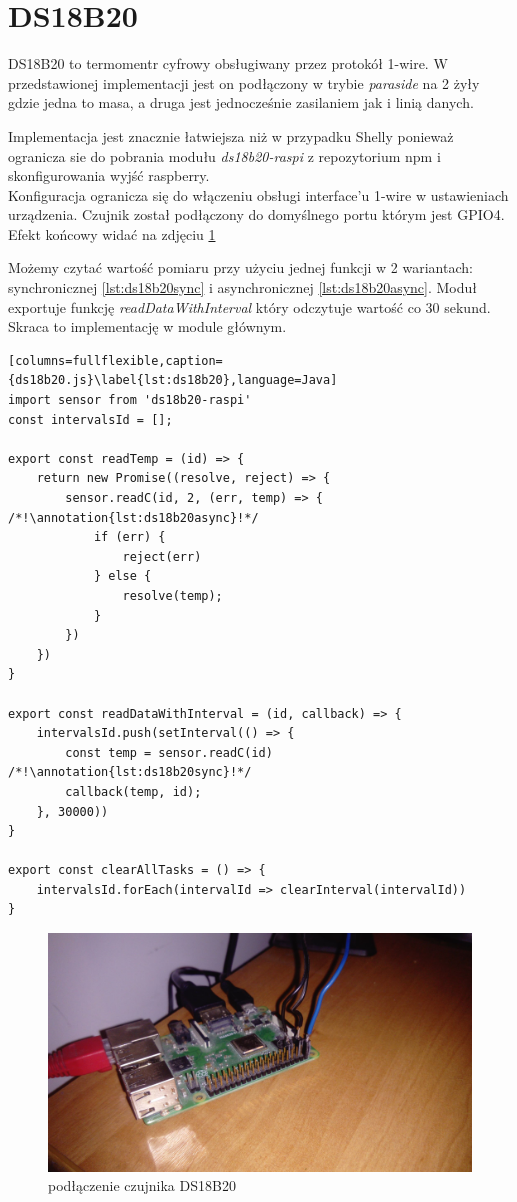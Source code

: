 \section{DS18B20}
DS18B20 to termomentr cyfrowy obsługiwany przez protokół 1-wire. W przedstawionej implementacji jest on podłączony w trybie \textit{paraside} na 2 żyły gdzie jedna to masa, a druga jest jednocześnie zasilaniem jak i linią danych. 
\par Implementacja jest znacznie łatwiejsza niż w przypadku Shelly ponieważ ogranicza sie do pobrania modułu \textit{ds18b20-raspi} z repozytorium npm i skonfigurowania wyjść raspberry. \\
Konfiguracja ogranicza się do włączeniu obsługi interface'u 1-wire w ustawieniach urządzenia. Czujnik został podłączony do domyślnego portu którym jest GPIO4. Efekt końcowy widać na zdjęciu \ref{fig:finalGPIOConnections}
\par Możemy czytać wartość pomiaru przy użyciu jednej funkcji w 2 wariantach: synchronicznej \ref{lst:ds18b20sync} i asynchronicznej \ref{lst:ds18b20async}. Moduł exportuje funkcję \textit{readDataWithInterval} który odczytuje wartość co 30 sekund. Skraca to implementację w module głównym.
\newpage
\begin{lstlisting}[columns=fullflexible,caption={ds18b20.js}\label{lst:ds18b20},language=Java]
import sensor from 'ds18b20-raspi'
const intervalsId = [];

export const readTemp = (id) => {
    return new Promise((resolve, reject) => {
        sensor.readC(id, 2, (err, temp) => { /*!\annotation{lst:ds18b20async}!*/
            if (err) {
                reject(err)
            } else {
                resolve(temp);
            }
        })
    })
}

export const readDataWithInterval = (id, callback) => {
    intervalsId.push(setInterval(() => {
        const temp = sensor.readC(id) /*!\annotation{lst:ds18b20sync}!*/
        callback(temp, id);
    }, 30000))
}

export const clearAllTasks = () => {
    intervalsId.forEach(intervalId => clearInterval(intervalId))
}
\end{lstlisting}
\begin{figure}[h]
  \includegraphics[width=\linewidth]{gpio.jpg}
  \caption{podłączenie czujnika DS18B20}
  \label{fig:finalGPIOConnections}
\end{figure}